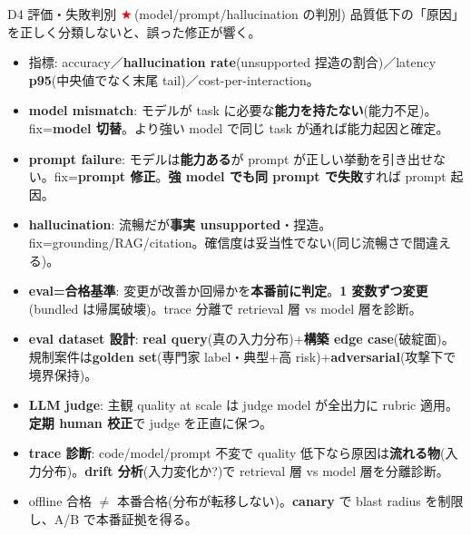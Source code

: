\documentclass[10pt,a4paper]{article}
\newcommand{\R}[1]{\textcolor{cred}{\textbf{#1}}}
\newcommand{\B}[1]{\textcolor{cblue}{\textbf{#1}}}
\newcommand{\stc}{\textcolor{red}{\ensuremath{\bigstar}}\,}
\begin{document}
\begin{minipage}[t]{0.333\textwidth}
\begin{boxamber}{D4 評価・失敗判別 \stc (model/prompt/hallucination の判別)}
品質低下の「原因」を正しく分類しないと、誤った修正が響く。
\begin{itemize}
\item 指標: accuracy／\B{hallucination rate}(unsupported 捏造の割合)／latency \B{p95}(中央値でなく末尾 tail)／cost-per-interaction。
\item \R{model mismatch}: モデルが task に必要な\B{能力を持たない}(能力不足)。fix=\B{model 切替}。より強い model で同じ task が通れば能力起因と確定。
\item \R{prompt failure}: モデルは\B{能力ある}が prompt が正しい挙動を引き出せない。fix=\B{prompt 修正}。\B{強 model でも同 prompt で失敗}すれば prompt 起因。
\item \R{hallucination}: 流暢だが\B{事実 unsupported}・捏造。fix=grounding/RAG/citation。確信度は妥当性でない(同じ流暢さで間違える)。
\item \R{eval=合格基準}: 変更が改善か回帰かを\B{本番前に判定}。\B{1 変数ずつ変更}(bundled は帰属破壊)。trace 分離で retrieval 層 vs model 層を診断。
\item \R{eval dataset 設計}: \B{real query}(真の入力分布)+\B{構築 edge case}(破綻面)。規制案件は\B{golden set}(専門家 label・典型+高 risk)+\B{adversarial}(攻撃下で境界保持)。
\item \R{LLM judge}: 主観 quality at scale は judge model が全出力に rubric 適用。\B{定期 human 校正}で judge を正直に保つ。
\item \R{trace 診断}: code/model/prompt 不変で quality 低下なら原因は\B{流れる物}(入力分布)。\B{drift 分析}(入力変化か?)で retrieval 層 vs model 層を分離診断。
\item offline 合格 $\neq$ 本番合格(分布が転移しない)。\B{canary} で blast radius を制限し、A/B で本番証拠を得る。
\end{itemize}
\end{boxamber}

\end{minipage}\hfill
\end{document}
